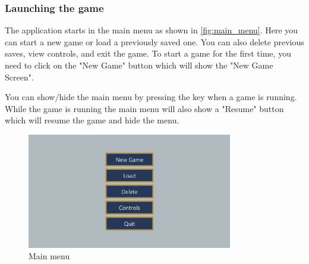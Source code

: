 \subsubsection{Launching the game}
The application starts in the main menu as shown in \autoref{fig:main_menu}.
Here you can start a new game or load a previously saved one.
You can also delete previous saves, view controls, and exit the game.
To start a game for the first time, you need to click on the "New Game" button which will show the "New Game Screen".

You can show/hide the main menu by pressing the \keys{\escwin} key when a game is running.
While the game is running the main menu will also show a "Resume" button which will resume the game and hide the menu.

\begin{figure}[H]
    \centering
    \includegraphics[width=0.8\textwidth]{chapters/user_manual/resources/main-menu.png}
    \caption{Main menu}
    \label{fig:main_menu}
\end{figure}